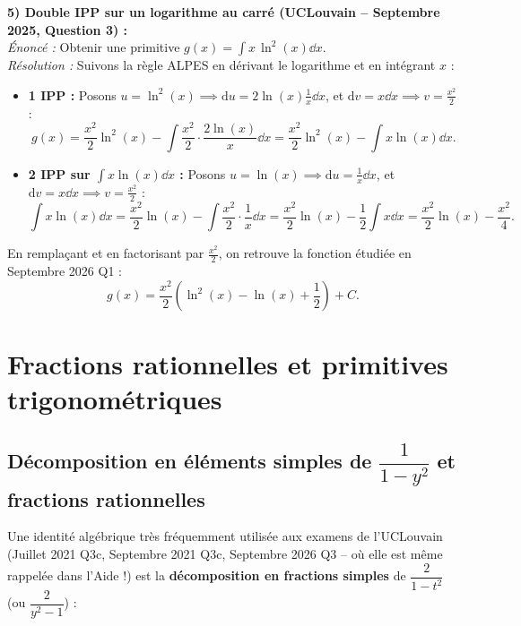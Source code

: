 \begin{exemple}
\medskip
\textbf{5) Double IPP sur un logarithme au carré (UCLouvain -- Septembre 2025, Question 3) :}\\
\emph{Énoncé :} Obtenir une primitive $g(x) = \displaystyle\int x\,\ln^2(x)\dd x$.\\
\emph{Résolution :} Suivons la règle ALPES en dérivant le logarithme et en intégrant $x$ :
\begin{itemize}
    \item \textbf{1\iere{} IPP :} Posons $u = \ln^2(x) \implies \mathrm{d}u = 2\ln(x)\frac{1}{x}\dd x$, et $\mathrm{d}v = x\dd x \implies v = \frac{x^2}{2}$ :
    \[
        g(x) = \frac{x^2}{2}\ln^2(x) - \int \frac{x^2}{2} \cdot \frac{2\ln(x)}{x}\dd x = \frac{x^2}{2}\ln^2(x) - \int x\ln(x)\dd x.
    \]
    \item \textbf{2\ieme{} IPP sur $\displaystyle\int x\ln(x)\dd x$ :} Posons $u = \ln(x) \implies \mathrm{d}u = \frac{1}{x}\dd x$, et $\mathrm{d}v = x\dd x \implies v = \frac{x^2}{2}$ :
    \[
        \int x\ln(x)\dd x = \frac{x^2}{2}\ln(x) - \int \frac{x^2}{2}\cdot\frac{1}{x}\dd x = \frac{x^2}{2}\ln(x) - \frac{1}{2}\int x\dd x = \frac{x^2}{2}\ln(x) - \frac{x^2}{4}.
    \]
\end{itemize}
En remplaçant et en factorisant par $\frac{x^2}{2}$, on retrouve la fonction étudiée en Septembre 2026 Q1 :
\[
    \boxed{g(x) = \frac{x^2}{2}\left(\ln^2(x) - \ln(x) + \frac{1}{2}\right) + C}.
\]
\end{exemple}

\section{Fractions rationnelles et primitives trigonométriques}

\subsection{Décomposition en éléments simples de $\dfrac{1}{1 - y^2}$ et fractions rationnelles}

Une identité algébrique très fréquemment utilisée aux examens de l'UCLouvain (Juillet 2021 Q3c, Septembre 2021 Q3c, Septembre 2026 Q3 -- où elle est même rappelée dans l'Aide !) est la \textbf{décomposition en fractions simples} de $\dfrac{2}{1 - t^2}$ (ou $\dfrac{2}{y^2 - 1}$) :

